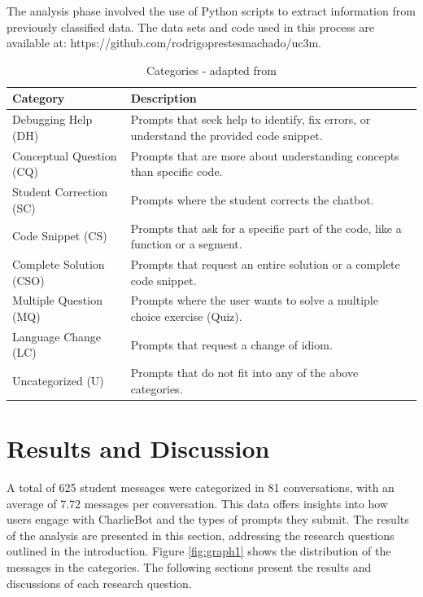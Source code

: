 \documentclass[runningheads]{llncs}
\begin{document}
The analysis phase involved the use of Python scripts to extract information
from previously classified data. The data sets and code used in this process are
available at: https://github.com/rodrigoprestesmachado/uc3m.

\begin{table}[htbp]
\caption{Categories - adapted from \cite{Ghimire24}}
\centering
\renewcommand{\arraystretch}{1.2} %
\begin{tabular}{|p{4cm}|p{8cm}|} %
\hline
\textbf{Category} & \textbf{Description} \\
\hline
Debugging Help (DH) & Prompts that seek help to identify, fix errors, or understand the provided code snippet. \\
Conceptual Question (CQ) & Prompts that are more about understanding concepts than specific code. \\
Student Correction (SC) & Prompts where the student corrects the chatbot. \\
Code Snippet  (CS) & Prompts that ask for a specific part of the code, like a function or a segment. \\
Complete Solution (CSO) & Prompts that request an entire solution or a complete code snippet. \\
Multiple Question (MQ) & Prompts where the user wants to solve a multiple choice exercise (Quiz). \\
Language Change (LC) & Prompts that request a change of idiom. \\
Uncategorized (U) & Prompts that do not fit into any of the above categories. \\
\hline
\end{tabular}
\label{tab:categories}
\end{table}


\section{Results and Discussion}

A total of 625 student messages were categorized in 81 conversations, with
an average of 7.72 messages per conversation. This data offers insights into how
users engage with CharlieBot and the types of prompts they submit. The results
of the analysis are presented in this section, addressing the research questions
outlined in the introduction. Figure \ref{fig:graph1} shows the distribution of
the messages in the categories. The following sections present the results and
discussions of each research question.
\end{document}
